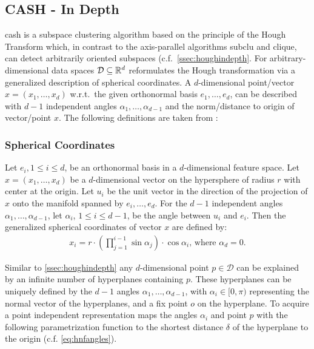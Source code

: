 \subsection{CASH - In Depth}\label{ssec:CASHindepth}
\acrfull{cash} is a subspace clustering algorithm based on the principle of the Hough Transform which, in contrast to the axis-parallel algorithms \acrshort{subclu}\cite{sublcukailing2004density} and \acrshort{clique}\cite{cliqueagrawal1998automatic}, can detect arbitrarily oriented subspaces (c.f.~\autoref{ssec:houghindepth}. 
For arbitrary-dimensional data spaces $\mathcal{D} \subseteq \mathbb{R}^d$ \textcite{CASHachtert2008robust} reformulates the Hough transformation via a generalized description of spherical coordinates. A $d$-dimensional point/vector $x=(x_1,\dotsc,x_d)$ w.r.t.\ the given orthonormal basis $e_1,\dotsc,e_d$, can be described with $d-1$ independent angles $\alpha_1,\dotsc,\alpha_{d-1}$ and the norm/distance to origin of vector/point $x$. The following definitions are taken from \cite{CASHachtert2008robust}:

\subsubsection*{Spherical Coordinates}\label{def:spherecord}
Let $e_i, 1 \leq i \leq d$, be an orthonormal basis in a $d$-dimensional feature space. Let $x=(x_1,\dotsc,x_d)$ be a $d$-dimensional vector on the hypersphere of radius $r$ with center at the origin. Let $u_i$ be the unit vector in the direction of the projection of $x$ onto the manifold spanned by $e_i,\dotsc,e_d$. For the $d-1$ independent angles $\alpha_1,\dotsc,\alpha_{d-1}$, let $\alpha_i$, $1 \leq i \leq d-1$, be the angle between $u_i$ and $e_i$. Then the generalized spherical coordinates of vector $x$ are defined by:
\begin{align}
    x_i = r \cdot (\prod_{j=1}^{i-1}\sin{\alpha_j}) \cdot \cos{\alpha_i}\text{, where } \alpha_d = 0.
\end{align}

Similar to \autoref{ssec:houghindepth} any $d$-dimensional point $p \in \mathcal{D}$ can be explained by an infinite number of hyperplanes containing $p$. These hyperplanes can be uniquely defined by the $d-1$ angles $\alpha_1,\dotsc,\alpha_{d-1}$, with $\alpha_i \in [0,\pi)$ representing the normal vector of the hyperplanes, and a fix point $o$ on the hyperplane. To acquire a point independent representation \textcite{CASHachtert2008robust} maps the angles $\alpha_i$ and point $p$ with the following parametrization function to the shortest distance $\delta$ of the hyperplane to the origin (c.f. \ref{eq:hnfangles}).

